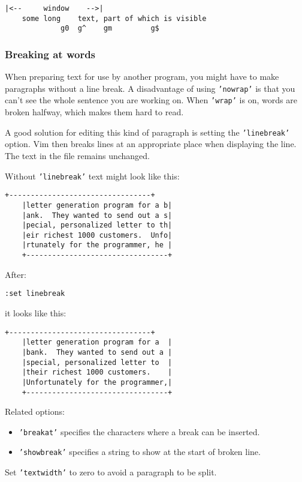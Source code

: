 \begin{Verbatim}[samepage=true]
            |<--     window    -->|
    some long    text, part of which is visible 
             g0  g^    gm         g$
\end{Verbatim}

\subsubsection{Breaking at words}
\label{edit-no-break}
When preparing text for use by another program, you might have to make paragraphs without a line break.
A disadvantage of using \texttt{'nowrap'} is that you can't see the whole sentence you are working on.
When \texttt{'wrap'} is on, words are broken halfway, which makes them hard to read.

A good solution for editing this kind of paragraph is setting the \texttt{'linebreak'} option.
Vim then breaks lines at an appropriate place when displaying the line.
The text in the file remains unchanged.

Without \texttt{'linebreak'} text might look like this:

\begin{Verbatim}[samepage=true]
    +---------------------------------+
    |letter generation program for a b|
    |ank.  They wanted to send out a s|
    |pecial, personalized letter to th|
    |eir richest 1000 customers.  Unfo|
    |rtunately for the programmer, he |
    +---------------------------------+
\end{Verbatim}

After:

\begin{Verbatim}[samepage=true]
 :set linebreak
\end{Verbatim}

it looks like this:

\begin{Verbatim}[samepage=true]
    +---------------------------------+
    |letter generation program for a  |
    |bank.  They wanted to send out a |
    |special, personalized letter to  |
    |their richest 1000 customers.    |
    |Unfortunately for the programmer,|
    +---------------------------------+
\end{Verbatim}

Related options:
\begin{itemize}
				\item \texttt{'breakat'} specifies the characters where a break can be inserted.
				\item \texttt{'showbreak'} specifies a string to show at the start of broken line.
\end{itemize}
Set \texttt{'textwidth'} to zero to avoid a paragraph to be split.
